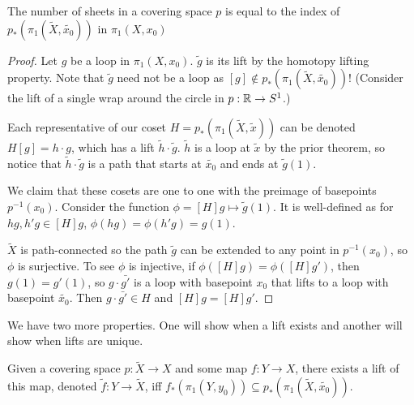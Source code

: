 \documentclass[10pt]{article}
\begin{document}
\begin{proposition}
	The number of sheets in a covering space $p$ is equal to the index of
	$p_*(\pi_1(\tilde{X}, \tilde{x_0}))$ in $\pi_1(X, x_0)$
\end{proposition}

\begin{proof}
	Let $g$ be a loop in $\pi_1(X, x_0)$. $\tilde{g}$ is its lift by the homotopy
	lifting property. Note that $\tilde{g}$ need not be a loop as $[g] \notin
	p_*(\pi_1(\tilde{X}, \tilde{x_0}))$! (Consider the lift
	of a single wrap around the circle in $p: \mathbb{R} \to S^1$.)

	Each representative of our coset $H = p_*(\pi_1(\tilde{X}, \tilde{x}))$ can
	be denoted $H[g] = h\cdot g$, which has a lift $\tilde{h}\cdot\tilde{g}$.
	$\tilde{h}$ is a loop at $\tilde{x}$ by the prior theorem, so notice that
	$\tilde{h}\cdot\tilde{g}$ is a path that starts at $\tilde{x_0}$ and ends at
	$\tilde{g}(1)$.

	We claim that these cosets are one to one with the preimage of
	basepoints $p^{-1}(x_0)$. Consider the function $\phi = [H]g \mapsto
	\tilde{g}(1)$. It is well-defined as for $hg, h'g \in [H]g$, $\phi(hg) =
	\phi(h'g) = g(1)$.

	$\tilde{X}$ is path-connected so the path $\tilde{g}$ can be extended to any
	point in $p^{-1}(x_0)$, so $\phi$ is surjective. To see $\phi$ is injective,
	if $\phi([H]g) = \phi([H]g')$, then $g(1) = g'(1)$, so $g\cdot\bar{g'}$ is a
	loop with basepoint $x_0$ that lifts to a loop with basepoint $\tilde{x_0}$.
	Then $g\cdot\bar{g'} \in H$ and $[H]g = [H]g'$.
\end{proof}

We have two more properties. One will show when a lift exists and another will
show when lifts are unique.

\begin{proposition}
	Given a covering space $p: \tilde{X} \to X$ and some map $f: Y \to X$, there
	exists a lift of this map, denoted $\tilde{f}: Y \to \tilde{X}$, iff $f_*(\pi_1(Y, y_0)) \subseteq
	p_*(\pi_1(\tilde{X}, \tilde{x_0}))$.
\end{proposition}
\end{document}
